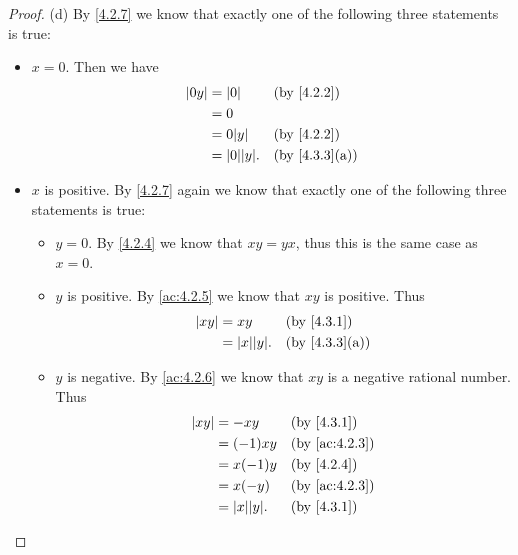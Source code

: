 \begin{proof}{(d)}
  By \cref{4.2.7} we know that exactly one of the following three statements is true:
  \begin{itemize}
    \item \(x = 0\).
          Then we have
          \begin{align*}
            \abs{0y} & = \abs{0}          &  & \by{4.2.2}                  \\
                     & = 0                                                 \\
                     & = 0 \abs{y}        &  & \by{4.2.2}                  \\
                     & = \abs{0} \abs{y}. &  & \text{(by \cref{4.3.3}(a))}
          \end{align*}
    \item \(x\) is positive.
          By \cref{4.2.7} again we know that exactly one of the following three statements is true:
          \begin{itemize}
            \item \(y = 0\).
                  By \cref{4.2.4} we know that \(xy = yx\), thus this is the same case as \(x = 0\).
            \item \(y\) is positive.
                  By \cref{ac:4.2.5} we know that \(xy\) is positive.
                  Thus
                  \begin{align*}
                    \abs{xy} & = xy               &  & \by{4.3.1}                  \\
                             & = \abs{x} \abs{y}. &  & \text{(by \cref{4.3.3}(a))}
                  \end{align*}
            \item \(y\) is negative.
                  By \cref{ac:4.2.6} we know that \(xy\) is a negative rational number.
                  Thus
                  \begin{align*}
                    \abs{xy} & = -xy              &  & \by{4.3.1}    \\
                             & = (-1)xy           &  & \by{ac:4.2.3} \\
                             & = x(-1)y           &  & \by{4.2.4}    \\
                             & = x(-y)            &  & \by{ac:4.2.3} \\
                             & = \abs{x} \abs{y}. &  & \by{4.3.1}    \\
                  \end{align*}

\end{itemize}
\end{itemize}
\end{proof}
